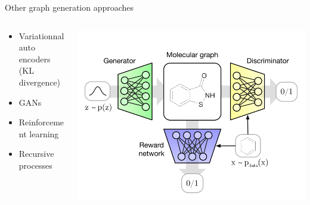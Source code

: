 \documentclass[11pt]{beamer}
\begin{document}
\begin{frame}{Other graph generation approaches}
  \begin{columns}
    \begin{column}{.6\textwidth}
      \begin{itemize}
      \item Variationnal auto encoders\\ (KL divergence)
      \item GANs
      \item Reinforcement learning
      \item Recursive processes
      \end{itemize}
    \end{column}
    \begin{column}{0.4\textwidth}
      \includegraphics[width=\textwidth]{molgan_overview}
      
    \end{column}
  \end{columns}
  \vfill
{}
  
\end{frame}
\end{document}

